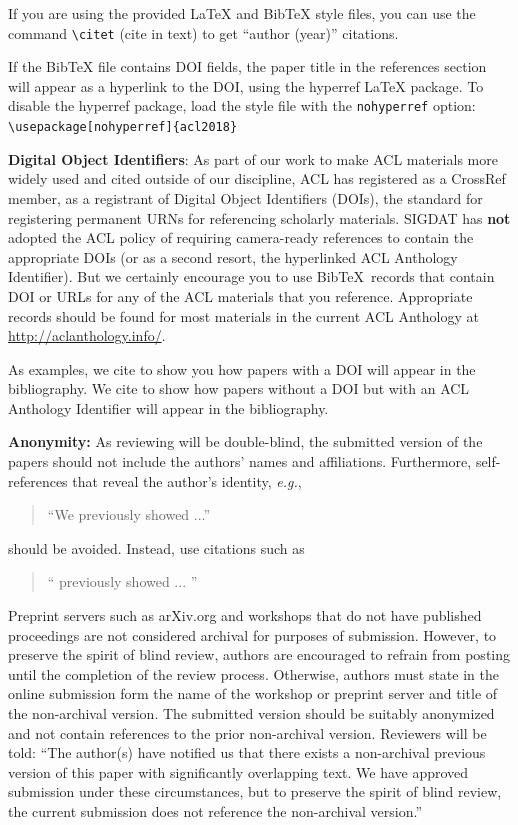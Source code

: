 \documentclass[11pt,a4paper]{article}
\newcommand\conforg{SIGDAT}
\begin{document}
If you are using the provided \LaTeX{} and Bib\TeX{} style files, you
can use the command \verb|\citet| (cite in text)
to get ``author (year)'' citations.

If the Bib\TeX{} file contains DOI fields, the paper
title in the references section will appear as a hyperlink
to the DOI, using the hyperref \LaTeX{} package.
To disable the hyperref package, load the style file
with the \verb|nohyperref| option: \\{\small
\verb|\usepackage[nohyperref]{acl2018}|}


\textbf{Digital Object Identifiers}: As part of our work to make ACL
materials more widely used and cited outside of our discipline, ACL
has registered as a CrossRef member, as a registrant of Digital Object
Identifiers (DOIs), the standard for registering permanent URNs for
referencing scholarly materials. \conforg{} has \textbf{not} adopted the
ACL policy of requiring camera-ready references to contain the appropriate
  DOIs (or as a second resort, the hyperlinked ACL Anthology
  Identifier). But we certainly encourage you to use
  Bib\TeX\ records that contain DOI or URLs for any of the ACL
  materials that you reference. Appropriate records should be found
for most materials in the current ACL Anthology at
\url{http://aclanthology.info/}.

As examples, we cite \cite{P16-1001} to show you how papers with a DOI
will appear in the bibliography.  We cite \cite{C14-1001} to show how
papers without a DOI but with an ACL Anthology Identifier will appear
in the bibliography.  

\textbf{Anonymity:} As reviewing will be double-blind, the submitted
version of the papers should not include the authors' names and
affiliations. Furthermore, self-references that reveal the author's
identity, {\em e.g.},
\begin{quote}
``We previously showed \cite{Gusfield:97} ...''  
\end{quote}
should be avoided. Instead, use citations such as 
\begin{quote}
``\citeauthor{Gusfield:97} 
previously showed ... ''
\end{quote}

Preprint servers such as arXiv.org and workshops that do not
have published proceedings are not considered archival for purposes of
submission. However, to preserve the spirit of blind review, authors
are encouraged to refrain from posting until the completion of the
review process. Otherwise, authors must state in the online submission
form the name of the workshop or preprint server and title of the
non-archival version. The submitted version should be suitably
anonymized and not contain references to the prior non-archival
version. Reviewers will be told: ``The author(s) have notified us that
there exists a non-archival previous version of this paper with
significantly overlapping text. We have approved submission under
these circumstances, but to preserve the spirit of blind review, the
current submission does not reference the non-archival version.''
\end{document}
